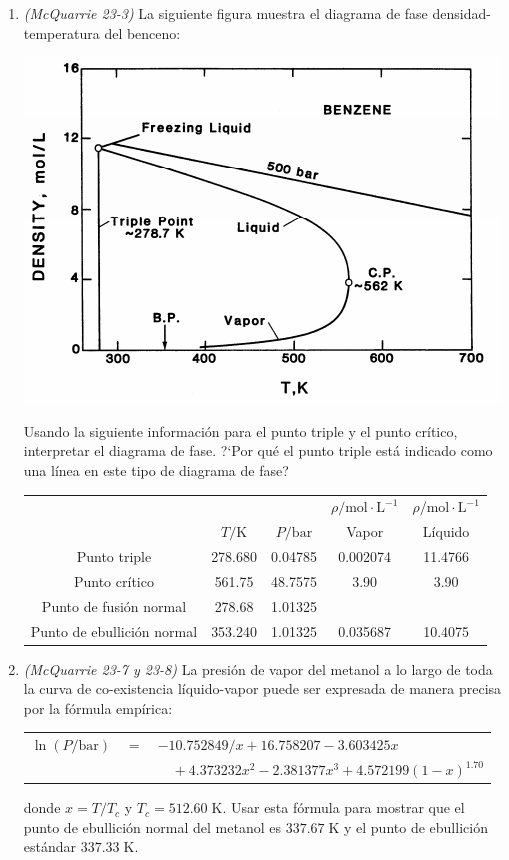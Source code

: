 \documentclass[a4paper,12pt]{article}
\begin{document}
\begin{enumerate}
 \item \textit{(McQuarrie 23-3)}  La siguiente figura muestra el diagrama de fase densidad-temperatura del benceno:
\begin{center}
 \includegraphics[scale=0.5]{figure5}
\end{center}
Usando la siguiente informaci\'on para el punto triple y el punto cr\'itico, interpretar el diagrama de fase. ?`Por qu\'e el punto triple est\'a indicado como una l\'inea en este tipo de diagrama de fase?

\begin{center}
\begin{tabular}{c|c c c c}
 &  &  & $\rho/\mbox{mol}\cdot\mbox{L}^{-1}$ & $\rho/\mbox{mol}\cdot\mbox{L}^{-1}$ \\
 & $T/\mbox{K}$ & $P/\mbox{bar}$ & Vapor & L\'iquido \\\hline
Punto triple & 278.680 & 0.04785 & 0.002074 & 11.4766 \\
Punto cr\'itico & 561.75 & 48.7575 & 3.90 & 3.90 \\
Punto de fusi\'on normal & 278.68 & 1.01325 &  &  \\
Punto de ebullici\'on normal & 353.240 & 1.01325 & 0.035687 & 10.4075  
\end{tabular}
\end{center} %

 \item \textit{(McQuarrie 23-7 y 23-8)} La presi\'on de vapor del metanol a lo largo de toda la curva de co-existencia l\'iquido-vapor puede ser expresada de manera precisa por la f\'ormula emp\'irica:

\begin{center}
\begin{tabular}{r c l}
$\ln(P/\mbox{bar})$ & $=$ & $-10.752849/x+16.758207-3.603425x$\\
& & $\quad +4.373232x^2-2.381377x^3+4.572199(1-x)^{1.70}$
\end{tabular}
\end{center} 
donde $x=T/T_c$ y $T_c=512.60\;\mbox{K}$. Usar esta f\'ormula para mostrar que el punto de ebullici\'on normal del metanol es $337.67\;\mbox{K}$ y el punto de ebullici\'on est\'andar $337.33\;\mbox{K}$. %

\end{enumerate}
 
\end{document}
